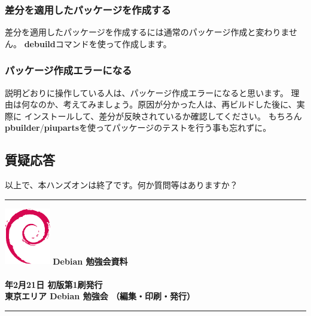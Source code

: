 \documentclass[mingoth,a4paper]{jsarticle}
\newcommand{\debmtgyear}{2009}
\newcommand{\debmtgmonth}{2}
\newcommand{\debmtgdate}{21}
\begin{document}
\subsubsection{差分を適用したパッケージを作成する}
差分を適用したパッケージを作成するには通常のパッケージ作成と変わりません。
{\bf debuild}コマンドを使って作成します。

\subsubsection{パッケージ作成エラーになる}
説明どおりに操作している人は、パッケージ作成エラーになると思います。
理由は何なのか、考えてみましょう。原因が分かった人は、再ビルドした後に、実際に
インストールして、差分が反映されているか確認してください。
もちろん{\bf pbuilder}/{\bf piuparts}を使ってパッケージのテストを行う事も忘れずに。

\subsection{質疑応答}
以上で、本ハンズオンは終了です。何か質問等はありますか？

\cleartooddpage

\vspace*{15cm}
\hrule
\vspace{2mm}
\includegraphics[width=2cm]{image200502/openlogo-nd.eps}
\noindent \Large \bf Debian 勉強会資料\\ \\
\noindent \normalfont \debmtgyear{}年\debmtgmonth{}月\debmtgdate{}日 \hspace{5mm}  初版第1刷発行\\
\noindent \normalfont 東京エリア Debian 勉強会 （編集・印刷・発行）\\
\hrule
\end{document}
